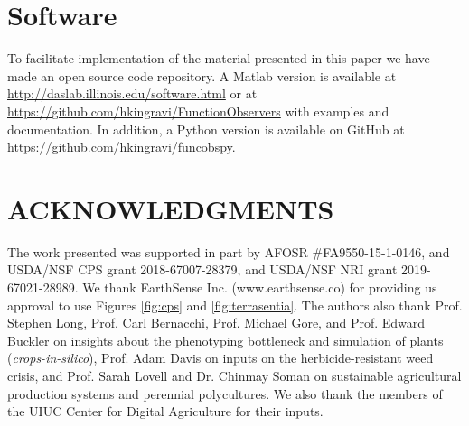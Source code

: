 \documentclass[letterpaper,12pt,peerreviewca,draftcls]{IEEEtran}
\newcommand{\XX}[1]{{\bf XX #1 XX}}
\begin{document}







\section{Software}
To facilitate implementation of the material presented in this paper we have made an open source code repository. A Matlab version is available at \url{http://daslab.illinois.edu/software.html} or at \url{https://github.com/hkingravi/FunctionObservers} with examples and documentation. In addition, a Python version is available on GitHub at \url{https://github.com/hkingravi/funcobspy}.

\section{ACKNOWLEDGMENTS}
The work presented was supported in part by AFOSR \#FA9550-15-1-0146, %
and USDA/NSF CPS grant 2018-67007-28379, and USDA/NSF NRI grant 2019-67021-28989.  We thank EarthSense Inc. (www.earthsense.co) for providing us approval to use Figures \ref{fig:cps} and \ref{fig:terrasentia}. The authors also thank Prof. Stephen Long, Prof. Carl Bernacchi, Prof. Michael Gore, and Prof. Edward Buckler on insights about the phenotyping bottleneck and simulation of plants (\textit{crops-in-silico}), Prof. Adam Davis on inputs on the herbicide-resistant weed crisis, and Prof. Sarah Lovell and Dr. Chinmay Soman on sustainable agricultural production systems and perennial polycultures. We also thank the members of the UIUC Center for Digital Agriculture for their inputs.

%


\clearpage


\end{document}
